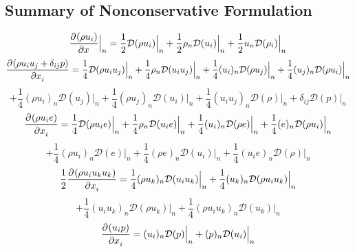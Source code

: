 \documentclass[12pt]{article}
\numberwithin{equation}{section}
\numberwithin{figure}{section}
\begin{document}
\subsection{Summary of Nonconservative Formulation}
\begin{equation}
\frac{\partial^{} (\rho u_i)}{\partial x^{}}\Big|_n = \frac{1}{2}\mathcal{D}(\rho u_i)\Big|_n + \frac{1}{2}\rho_n\mathcal{D}(u_i)\Big|_n + \frac{1}{2}u_n\mathcal{D}(\rho_i)\Big|_n
\end{equation}
\begin{equation*}
\frac{\partial^{} (\rho u_i u_j + \delta_{ij}p)}{\partial x_i^{}} = \frac{1}{4}\mathcal{D}(\rho u_i u_j)\Big|_n
+ \frac{1}{4}\rho_n\mathcal{D}(u_i u_j)\Big|_n
+ \frac{1}{4}(u_i)_n\mathcal{D}(\rho u_j)\Big|_n
+ \frac{1}{4}(u_j)_n\mathcal{D}(\rho u_i)\Big|_n
\end{equation*}
\begin{equation}
+ \frac{1}{4}(\rho u_i)_n\mathcal{D}(u_j)\Big|_n
+ \frac{1}{4}(\rho u_j)_n\mathcal{D}(u_i)\Big|_n
+ \frac{1}{4}(u_i u_j)_n\mathcal{D}(\rho)\Big|_n + \delta_{ij}\mathcal{D}(p)\Big|_n
\end{equation}
\begin{equation*}
\frac{\partial^{} (\rho u_i e)}{\partial x_i^{}} = \frac{1}{4}\mathcal{D}(\rho u_i e)\Big|_n
+ \frac{1}{4}\rho_n\mathcal{D}(u_i e)\Big|_n
+ \frac{1}{4}(u_i)_n\mathcal{D}(\rho e)\Big|_n
+ \frac{1}{4}(e)_n\mathcal{D}(\rho u_i)\Big|_n
\end{equation*}
\begin{equation}
+ \frac{1}{4}(\rho u_i)_n\mathcal{D}(e)\Big|_n
+ \frac{1}{4}(\rho e)_n\mathcal{D}(u_i)\Big|_n
+ \frac{1}{4}(u_i e)_n\mathcal{D}(\rho)\Big|_n
\end{equation}
\begin{equation*}
\frac{1}{2}\frac{\partial^{} (\rho u_i u_k u_k)}{\partial x_i^{}} = \frac{1}{4}(\rho u_k)_n\mathcal{D}(u_i u_k)\Big|_n + \frac{1}{4}(u_k)_n\mathcal{D}(\rho u_i u_k)\Big|_n
\end{equation*}
\begin{equation}
+ \frac{1}{4}(u_iu_k)_n\mathcal{D}(\rho u_k)\Big|_n
+ \frac{1}{4}(\rho u_i u_k)_n\mathcal{D}(u_k)\Big|_n
\end{equation}
\begin{equation}
\frac{\partial^{} (u_i p)}{\partial x_i^{}} = (u_i)_n\mathcal{D}(p)\Big|_n + (p)_n\mathcal{D}(u_i)\Big|_n
\end{equation}
\end{document}
